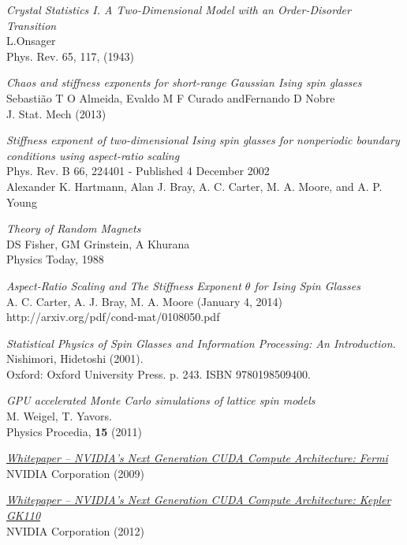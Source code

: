 \documentclass[paper=a4, fontsize=11pt]{scrartcl} %
\numberwithin{equation}{section} %
\numberwithin{figure}{section} %
\numberwithin{table}{section} %
\begin{document}
\begin{thebibliography}{100}

\textit{Crystal Statistics I. A Two-Dimensional Model with an Order-Disorder Transition} \\
L.Onsager \\
Phys. Rev. 65, 117, (1943)

\textit{Chaos and stiffness exponents for short-range Gaussian Ising spin glasses} \\
Sebasti\~{a}o T O Almeida, Evaldo M F Curado andFernando D Nobre \\
J. Stat. Mech (2013)

\textit{Stiffness exponent of two-dimensional Ising spin glasses for nonperiodic boundary conditions using aspect-ratio scaling} \\
Phys. Rev. B 66, 224401 - Published 4 December 2002 \\
Alexander K. Hartmann, Alan J. Bray, A. C. Carter, M. A. Moore, and A. P. Young

\textit{Theory of Random Magnets} \\
DS Fisher, GM Grinstein, A Khurana \\
Physics Today, 1988 

\textit{Aspect-Ratio Scaling and The Stiffness Exponent $\theta$ for Ising Spin Glasses} \\
A. C. Carter, A. J. Bray, M. A. Moore (January 4, 2014) \\
http://arxiv.org/pdf/cond-mat/0108050.pdf

\textit{Statistical Physics of Spin Glasses and Information Processing: An Introduction.} \\
Nishimori, Hidetoshi (2001). \\
Oxford: Oxford University Press. p. 243. ISBN 9780198509400.

\textit{GPU accelerated Monte Carlo simulations of lattice spin models} \\
M. Weigel, T. Yavors. \\
Physics Procedia, \textbf{15} (2011)

\href{http://www.nvidia.com/content/pdf/fermi_white_papers/nvidia_fermi_compute_architecture_whitepaper.pdf}{\textit{Whitepaper -- NVIDIA's Next Generation CUDA Compute Architecture: Fermi}} \\
NVIDIA Corporation (2009)

\href{http://www.nvidia.com/content/pdf/kepler/NVIDIA-kepler-GK110-Architecture-Whitepaper.pdf}{\textit{Whitepaper -- NVIDIA's Next Generation CUDA Compute Architecture: Kepler GK110}} \\
NVIDIA Corporation (2012)


\end{thebibliography}
\end{document}
